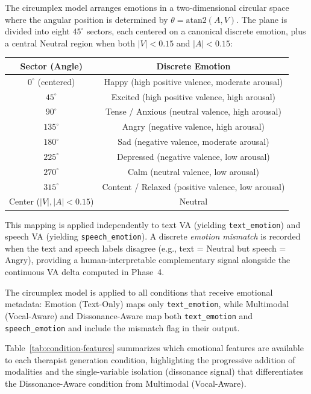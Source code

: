 The circumplex model arranges emotions in a two-dimensional circular space where the angular position is determined by $\theta = \text{atan2}(A, V)$. The plane is divided into eight $45^{\circ}$ sectors, each centered on a canonical discrete emotion, plus a central Neutral region when both $|V| < 0.15$ and $|A| < 0.15$:

\begin{center}
\begin{tabular}{cc}
\toprule
\textbf{Sector (Angle)} & \textbf{Discrete Emotion} \\
\midrule
$0^{\circ}$ (centered)   & Happy (high positive valence, moderate arousal) \\
$45^{\circ}$             & Excited (high positive valence, high arousal) \\
$90^{\circ}$             & Tense / Anxious (neutral valence, high arousal) \\
$135^{\circ}$            & Angry (negative valence, high arousal) \\
$180^{\circ}$            & Sad (negative valence, moderate arousal) \\
$225^{\circ}$            & Depressed (negative valence, low arousal) \\
$270^{\circ}$            & Calm (neutral valence, low arousal) \\
$315^{\circ}$            & Content / Relaxed (positive valence, low arousal) \\
Center ($|V|,|A| < 0.15$) & Neutral \\
\bottomrule
\end{tabular}
\end{center}

This mapping is applied independently to text VA (yielding \texttt{text\_emotion}) and speech VA (yielding \texttt{speech\_emotion}). A discrete \emph{emotion mismatch} is recorded when the text and speech labels disagree (e.g., text = Neutral but speech = Angry), providing a human-interpretable complementary signal alongside the continuous VA delta computed in Phase~4.

The circumplex model is applied to all conditions that receive emotional metadata: Emotion (Text-Only) maps only \texttt{text\_emotion}, while Multimodal (Vocal-Aware) and Dissonance-Aware map both \texttt{text\_emotion} and \texttt{speech\_emotion} and include the mismatch flag in their output.

Table~\ref{tab:condition-features} summarizes which emotional features are available to each therapist generation condition, highlighting the progressive addition of modalities and the single-variable isolation (dissonance signal) that differentiates the Dissonance-Aware condition from Multimodal (Vocal-Aware).

